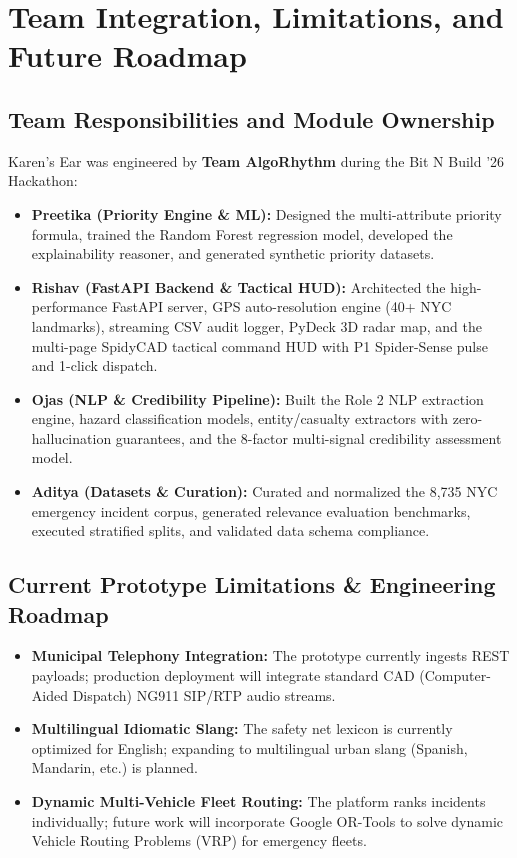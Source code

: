 \documentclass[10pt,a4paper]{article}
\begin{document}
\section{Team Integration, Limitations, and Future Roadmap}
\subsection{Team Responsibilities and Module Ownership}
Karen's Ear was engineered by \textbf{Team AlgoRhythm} during the Bit N Build '26 Hackathon:
\begin{itemize}
  \item \textbf{Preetika (Priority Engine \& ML):} Designed the multi-attribute priority formula, trained the Random Forest regression model, developed the explainability reasoner, and generated synthetic priority datasets.
  \item \textbf{Rishav (FastAPI Backend \& Tactical HUD):} Architected the high-performance FastAPI server, GPS auto-resolution engine (40+ NYC landmarks), streaming CSV audit logger, PyDeck 3D radar map, and the multi-page SpidyCAD tactical command HUD with P1 Spider-Sense pulse and 1-click dispatch.
  \item \textbf{Ojas (NLP \& Credibility Pipeline):} Built the Role 2 NLP extraction engine, hazard classification models, entity/casualty extractors with zero-hallucination guarantees, and the 8-factor multi-signal credibility assessment model.
  \item \textbf{Aditya (Datasets \& Curation):} Curated and normalized the 8,735 NYC emergency incident corpus, generated relevance evaluation benchmarks, executed stratified splits, and validated data schema compliance.
\end{itemize}

\subsection{Current Prototype Limitations \& Engineering Roadmap}
\begin{itemize}
  \item \textbf{Municipal Telephony Integration:} The prototype currently ingests REST payloads; production deployment will integrate standard CAD (Computer-Aided Dispatch) NG911 SIP/RTP audio streams.
  \item \textbf{Multilingual Idiomatic Slang:} The safety net lexicon is currently optimized for English; expanding to multilingual urban slang (Spanish, Mandarin, etc.) is planned.
  \item \textbf{Dynamic Multi-Vehicle Fleet Routing:} The platform ranks incidents individually; future work will incorporate Google OR-Tools to solve dynamic Vehicle Routing Problems (VRP) for emergency fleets.
\end{itemize}
\end{document}
